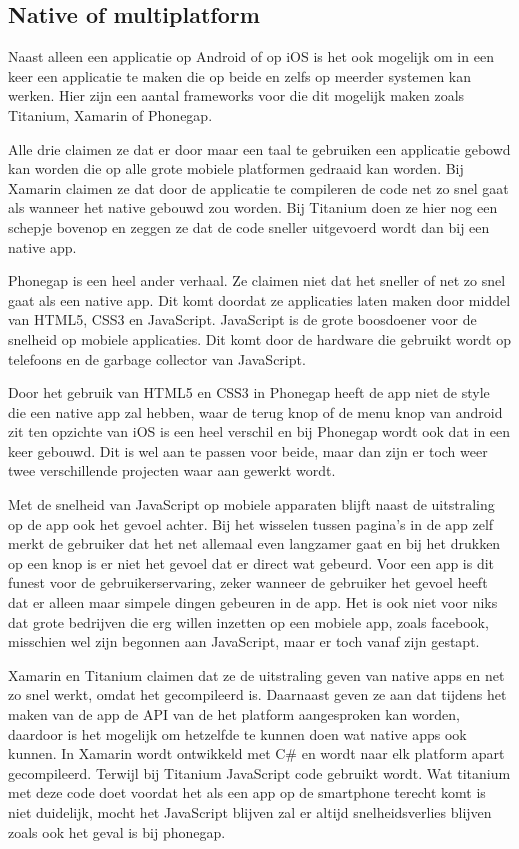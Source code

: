 \documentclass[a4paper,11pt,oneside]{report}
\begin{document}
\subsection{Native of multiplatform}
Naast alleen een applicatie op Android of op iOS is het ook mogelijk om in een
keer een applicatie te maken die op beide en zelfs op meerder systemen kan
werken. Hier zijn een aantal frameworks voor die dit mogelijk maken zoals
Titanium, Xamarin of Phonegap.

Alle drie claimen ze dat er door maar een taal te gebruiken een applicatie
gebowd kan worden die op alle grote mobiele platformen gedraaid kan worden. Bij
Xamarin claimen ze dat door de applicatie te compileren de code net zo snel gaat
als wanneer het native gebouwd zou worden. Bij Titanium doen ze hier nog een
schepje bovenop en zeggen ze dat de code sneller uitgevoerd wordt dan bij een
native app.

\label{phonegap} Phonegap is een heel ander verhaal. Ze claimen niet dat het
sneller of net zo snel gaat als een native app. Dit komt doordat ze applicaties
laten maken door middel van HTML5, CSS3 en JavaScript. JavaScript is de grote
boosdoener voor de snelheid op mobiele applicaties. Dit komt door de hardware
die gebruikt wordt op telefoons en de garbage collector van JavaScript.

Door het gebruik van HTML5 en CSS3 in Phonegap heeft de app niet de style die
een native app zal hebben, waar de terug knop of de menu knop van android zit
ten opzichte van iOS is een heel verschil en bij Phonegap wordt ook dat in een
keer gebouwd. Dit is wel aan te passen voor beide, maar dan zijn er toch weer
twee verschillende projecten waar aan gewerkt wordt.

Met de snelheid van JavaScript op mobiele apparaten blijft naast de uitstraling
op de app ook het gevoel achter. Bij het wisselen tussen pagina's in de app zelf
merkt de gebruiker dat het net allemaal even langzamer gaat en bij het drukken
op een knop is er niet het gevoel dat er direct wat gebeurd. Voor een app is dit
funest voor de gebruikerservaring, zeker wanneer de gebruiker het gevoel heeft
dat er alleen maar simpele dingen gebeuren in de app. Het is ook niet voor niks
dat grote bedrijven die erg willen inzetten op een mobiele app, zoals facebook,
misschien wel zijn begonnen aan JavaScript, maar er toch vanaf zijn gestapt.

Xamarin en Titanium claimen dat ze de uitstraling geven van native apps en net
zo snel werkt, omdat het gecompileerd is. Daarnaast geven ze aan dat tijdens het
maken van de app de API van de het platform aangesproken kan worden, daardoor is
het mogelijk om hetzelfde te kunnen doen wat native apps ook kunnen. In Xamarin
wordt ontwikkeld met C\# en wordt naar elk platform apart gecompileerd. Terwijl
bij Titanium JavaScript code gebruikt wordt. Wat titanium met deze code doet
voordat het als een app op de smartphone terecht komt is niet duidelijk, mocht
het JavaScript blijven zal er altijd snelheidsverlies blijven zoals ook het
geval is bij phonegap.
\end{document}
